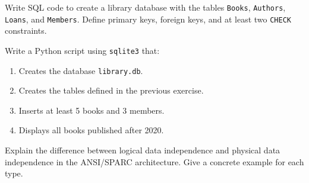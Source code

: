 \begin{exercise}
Write SQL code to create a library database with the tables \texttt{Books},
\texttt{Authors}, \texttt{Loans}, and \texttt{Members}. Define primary keys,
foreign keys, and at least two \texttt{CHECK} constraints.
\end{exercise}

\begin{exercise}
Write a Python script using \texttt{sqlite3} that:
\begin{enumerate}
    \item Creates the database \texttt{library.db}.
    \item Creates the tables defined in the previous exercise.
    \item Inserts at least 5 books and 3 members.
    \item Displays all books published after 2020.
\end{enumerate}
\end{exercise}

\begin{exercise}
Explain the difference between logical data independence and physical data
independence in the ANSI/SPARC architecture. Give a concrete example for each type.
\end{exercise}
